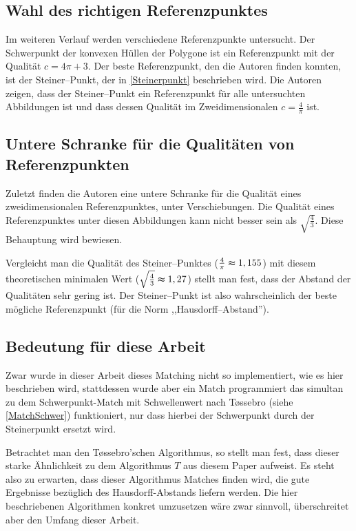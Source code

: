 \subsection{Wahl des richtigen Referenzpunktes}

Im weiteren Verlauf werden verschiedene Referenzpunkte untersucht. Der Schwerpunkt der konvexen Hüllen der Polygone ist ein Referenzpunkt mit der Qualität $c=4\pi+3$. Der beste Referenzpunkt, den die Autoren finden konnten, ist der Steiner--Punkt, der in \vref{Steinerpunkt} beschrieben wird. Die Autoren zeigen, dass der Steiner--Punkt ein Referenzpunkt für alle untersuchten Abbildungen ist und dass dessen Qualität im Zweidimensionalen $c=\frac{4}{\pi}$ ist. 

\subsection{Untere Schranke für die Qualitäten von Referenzpunkten}

Zuletzt finden die Autoren eine untere Schranke für die Qualität eines zweidimensionalen Referenzpunktes, unter Verschiebungen. Die Qualität eines Referenzpunktes unter diesen Abbildungen kann nicht besser sein als $\sqrt{\frac{4}{3}}$. Diese Behauptung wird bewiesen. 

Vergleicht man die Qualität des Steiner--Punktes ($\frac{4}{\pi}\thickapprox 1,155$) mit diesem theoretischen minimalen Wert ($\sqrt{\frac{4}{3}}\thickapprox 1,27$) stellt man fest, dass der Abstand der Qualitäten sehr gering ist. Der Steiner--Punkt ist also wahrscheinlich der beste mögliche Referenzpunkt (für die Norm ,,Hausdorff--Abstand'').

\subsection{Bedeutung für diese Arbeit}\label{BedeutungAAR}

Zwar wurde in dieser Arbeit dieses Matching nicht so implementiert, wie es hier beschrieben wird, stattdessen wurde aber ein Match programmiert das simultan zu dem Schwerpunkt-Match mit Schwellenwert nach T\o{}ssebro (siehe \vref{MatchSchwer}) funktioniert, nur dass hierbei der Schwerpunkt durch der Steinerpunkt ersetzt wird.

Betrachtet man den T\o{}ssebro'schen Algorithmus, so stellt man fest, dass dieser starke Ähnlichkeit zu dem Algorithmus $T$ aus diesem Paper aufweist. Es steht also zu erwarten, dass dieser Algorithmus Matches finden wird, die gute Ergebnisse bezüglich des Hausdorff-Abstands liefern werden. Die hier beschriebenen Algorithmen konkret umzusetzen wäre zwar sinnvoll, überschreitet aber den Umfang dieser Arbeit.

